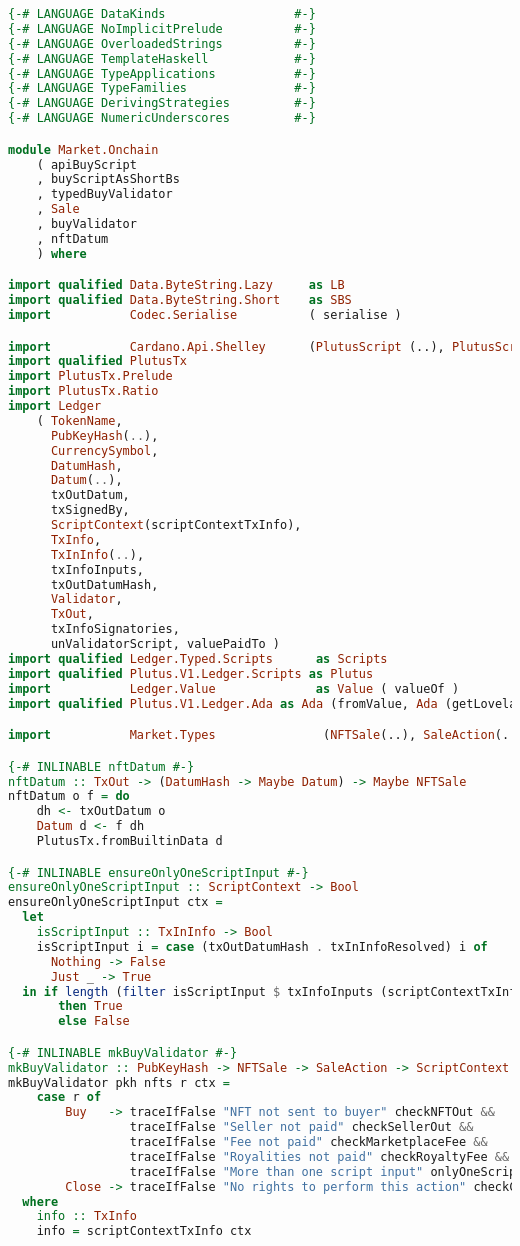 \begin{lstlisting}[language=haskell, caption=Plutus Code for Marketplace Contract]
{-# LANGUAGE DataKinds                  #-}
{-# LANGUAGE NoImplicitPrelude          #-}
{-# LANGUAGE OverloadedStrings          #-}
{-# LANGUAGE TemplateHaskell            #-}
{-# LANGUAGE TypeApplications           #-}
{-# LANGUAGE TypeFamilies               #-}
{-# LANGUAGE DerivingStrategies         #-}
{-# LANGUAGE NumericUnderscores         #-}

module Market.Onchain
    ( apiBuyScript
    , buyScriptAsShortBs
    , typedBuyValidator
    , Sale
    , buyValidator
    , nftDatum
    ) where

import qualified Data.ByteString.Lazy     as LB
import qualified Data.ByteString.Short    as SBS
import           Codec.Serialise          ( serialise )

import           Cardano.Api.Shelley      (PlutusScript (..), PlutusScriptV1)
import qualified PlutusTx
import PlutusTx.Prelude
import PlutusTx.Ratio
import Ledger
    ( TokenName,
      PubKeyHash(..),
      CurrencySymbol,
      DatumHash,
      Datum(..),
      txOutDatum,
      txSignedBy,
      ScriptContext(scriptContextTxInfo),
      TxInfo,
      TxInInfo(..),
      txInfoInputs,
      txOutDatumHash,
      Validator,
      TxOut,
      txInfoSignatories,
      unValidatorScript, valuePaidTo )
import qualified Ledger.Typed.Scripts      as Scripts
import qualified Plutus.V1.Ledger.Scripts as Plutus
import           Ledger.Value              as Value ( valueOf )
import qualified Plutus.V1.Ledger.Ada as Ada (fromValue, Ada (getLovelace))

import           Market.Types               (NFTSale(..), SaleAction(..))

{-# INLINABLE nftDatum #-}
nftDatum :: TxOut -> (DatumHash -> Maybe Datum) -> Maybe NFTSale
nftDatum o f = do
    dh <- txOutDatum o
    Datum d <- f dh
    PlutusTx.fromBuiltinData d

{-# INLINABLE ensureOnlyOneScriptInput #-}
ensureOnlyOneScriptInput :: ScriptContext -> Bool
ensureOnlyOneScriptInput ctx =
  let
    isScriptInput :: TxInInfo -> Bool
    isScriptInput i = case (txOutDatumHash . txInInfoResolved) i of
      Nothing -> False
      Just _ -> True
  in if length (filter isScriptInput $ txInfoInputs (scriptContextTxInfo ctx)) <= 1
       then True
       else False

{-# INLINABLE mkBuyValidator #-}
mkBuyValidator :: PubKeyHash -> NFTSale -> SaleAction -> ScriptContext -> Bool
mkBuyValidator pkh nfts r ctx =
    case r of
        Buy   -> traceIfFalse "NFT not sent to buyer" checkNFTOut &&
                 traceIfFalse "Seller not paid" checkSellerOut &&
                 traceIfFalse "Fee not paid" checkMarketplaceFee &&
                 traceIfFalse "Royalities not paid" checkRoyaltyFee &&
                 traceIfFalse "More than one script input" onlyOneScriptInput
        Close -> traceIfFalse "No rights to perform this action" checkCloser
  where
    info :: TxInfo
    info = scriptContextTxInfo ctx


\end{lstlisting}
